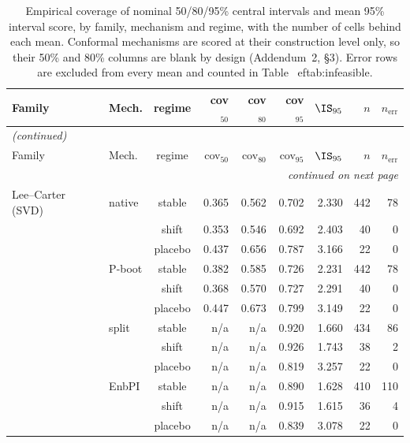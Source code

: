 {\footnotesize\setlength{\tabcolsep}{2.5pt}
\begin{longtable}{@{}llcrrrrrr@{}}
\caption{Empirical coverage of nominal 50/80/95\% central intervals and mean 95\% interval score, by family, mechanism and regime, with the number of cells behind each mean. Conformal mechanisms are scored at their construction level only, so their 50\% and 80\% columns are blank by design (Addendum~2, \S3). Error rows are excluded from every mean and counted in Table~
ef{tab:infeasible}.}\label{tab:h2-coverage} \\
\toprule
Family & Mech. & regime & cov$_{50}$ & cov$_{80}$ & cov$_{95}$ & $\IS_{95}$ & $n$ & $n_{\mathrm{err}}$ \\
\midrule
\endfirsthead
\multicolumn{9}{l}{\emph{(continued)}} \\
\toprule
Family & Mech. & regime & cov$_{50}$ & cov$_{80}$ & cov$_{95}$ & $\IS_{95}$ & $n$ & $n_{\mathrm{err}}$ \\
\midrule
\endhead
\midrule \multicolumn{9}{r}{\emph{continued on next page}} \\
\endfoot
\bottomrule
\endlastfoot
Lee--Carter (SVD) & native & stable & 0.365 & 0.562 & 0.702 & 2.330 & 442 & 78 \\
 &  & shift & 0.353 & 0.546 & 0.692 & 2.403 & 40 & 0 \\
 &  & placebo & 0.437 & 0.656 & 0.787 & 3.166 & 22 & 0 \\
 & P-boot & stable & 0.382 & 0.585 & 0.726 & 2.231 & 442 & 78 \\
 &  & shift & 0.368 & 0.570 & 0.727 & 2.291 & 40 & 0 \\
 &  & placebo & 0.447 & 0.673 & 0.799 & 3.149 & 22 & 0 \\
 & split & stable & n/a & n/a & 0.920 & 1.660 & 434 & 86 \\
 &  & shift & n/a & n/a & 0.926 & 1.743 & 38 & 2 \\
 &  & placebo & n/a & n/a & 0.819 & 3.257 & 22 & 0 \\
 & EnbPI & stable & n/a & n/a & 0.890 & 1.628 & 410 & 110 \\
 &  & shift & n/a & n/a & 0.915 & 1.615 & 36 & 4 \\
 &  & placebo & n/a & n/a & 0.839 & 3.078 & 22 & 0 \\

\end{longtable}}
